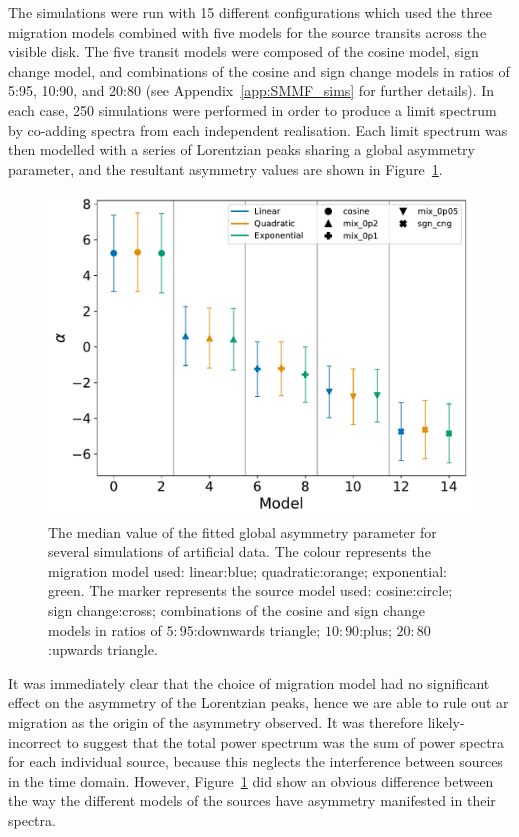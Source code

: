 The simulations were run with 15 different configurations which used the three migration models combined with five models for the source transits across the visible disk. The five transit models were composed of the cosine model, sign change model, and combinations of the cosine and sign change models in ratios of 5:95, 10:90, and 20:80 (see Appendix~\ref{app:SMMF_sims} for further details). In each case, 250 simulations were performed in order to produce a limit spectrum by co-adding spectra from each independent realisation. Each limit spectrum was then modelled with a series of Lorentzian peaks sharing a global asymmetry parameter, and the resultant asymmetry values are shown in Figure~\ref{fig:artificial_asymm}.

\begin{figure}[ht!]
	\centering
	\includegraphics[width=0.85\columnwidth]{artificial_fit_asym.pdf}
	\caption{The median value of the fitted global asymmetry parameter for several simulations of artificial data. The colour represents the migration model used: linear:blue; quadratic:orange; exponential: green. The marker represents the source model used: cosine:circle; sign change:cross; combinations of the cosine and sign change models in ratios of $5:95$:downwards triangle; $10:90$:plus; $20:80$:upwards triangle.}
	\label{fig:artificial_asymm}
\end{figure}

It was immediately clear that the choice of migration model had no significant effect on the asymmetry of the Lorentzian peaks, hence we are able to rule out \gls{ar} migration as the origin of the asymmetry observed. It was therefore likely-incorrect to suggest that the total power spectrum was the sum of power spectra for each individual source, because this neglects the interference between sources in the time domain. However, Figure~\ref{fig:artificial_asymm} did show an obvious difference between the way the different models of the sources have asymmetry manifested in their spectra.

